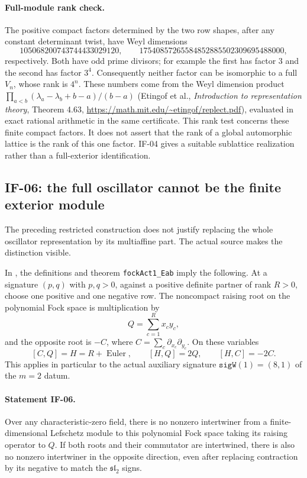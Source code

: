 \documentclass[11pt,a4paper]{article}
\theoremstyle{definition}
\theoremstyle{remark}
\begin{document}
\paragraph{Full-module rank check.}
The positive compact factors determined by the two row shapes, after
any constant determinant twist, have Weyl dimensions
\[
 105068200743744433029120,
 \qquad17540857265584852885502309695488000,
\]
respectively. Both have odd prime divisors; for example the first has
factor $3$ and the second has factor $3^4$. Consequently neither factor
can be isomorphic to a full $V_n$, whose rank is $4^n$. These numbers
come from the Weyl dimension product
$\prod_{a<b}(\lambda_a-\lambda_b+b-a)/(b-a)$ (Etingof et al.,
\emph{Introduction to representation theory}, Theorem 4.63,
\url{https://math.mit.edu/~etingof/replect.pdf}), evaluated in exact
rational arithmetic in the same certificate. This rank test concerns
these finite compact factors. It does not assert that the rank of a
global automorphic lattice is the rank of this one factor. IF-04 gives
a suitable sublattice realization rather than a full-exterior
identification.

\subsection{IF-06: the full oscillator cannot be the finite exterior module}
The preceding restricted construction does not justify replacing the
whole oscillator representation by its multiaffine part. The actual
source makes the distinction visible.

In , the definitions
 and theorem
\texttt{fockAct1\_Eab} imply the following. At a signature $(p,q)$ with
$p,q>0$, against a positive definite partner of rank $R>0$, choose one
positive and one negative row. The noncompact raising root on the
polynomial Fock space is multiplication by
\[
 Q=\sum_{c=1}^R x_c y_c,
\]
and the opposite root is $-C$, where
$C=\sum_c\partial_{x_c}\partial_{y_c}$. On these variables
\[
 [C,Q]=H=R+\operatorname{Euler},\qquad [H,Q]=2Q,\qquad[H,C]=-2C.
\]
This applies in particular to the actual auxiliary signature
$\texttt{sigW}(1)=(8,1)$ of the $m=2$ datum.

\paragraph{Statement IF-06.}
Over any characteristic-zero field, there is no nonzero intertwiner
from a finite-dimensional Lefschetz module to this polynomial Fock
space taking its raising operator to $Q$. If both roots and their
commutator are intertwined, there is also no nonzero intertwiner in
the opposite direction, even after replacing contraction by its
negative to match the $\mathfrak{sl}_2$ signs.
\end{document}
